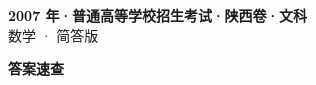 \documentclass[zihao=-4, a4paper]{ctexart}
\begin{document}
\begin{center}
  {\Large\bfseries 2007 年·普通高等学校招生考试·陕西卷·文科}\\[4pt]
  {\large 数学 · 简答版}
\end{center}
\medskip
{}

\clearpage
{}
\begin{center}{\Large\bfseries 答案速查}\end{center}
\medskip

\end{document}
